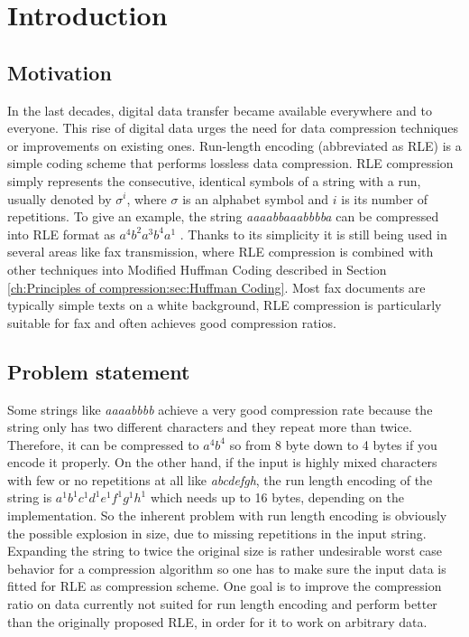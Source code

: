 
\chapter{Introduction}
\label{ch:Introduction}
\section{Motivation}
\label{ch:Introduction:sec:Motivation}
\par{
In the last decades, digital data transfer became available everywhere and to everyone. This rise of digital data urges the need for data compression techniques or improvements on existing ones. Run-length encoding \cite{rle-patent} (abbreviated as RLE) is a simple coding scheme that performs lossless data compression. RLE compression simply represents the consecutive, identical symbols of a string with a run, usually denoted by $\sigma^i$, where $\sigma$ is an alphabet symbol and $i$ is its number of repetitions. To give an example, the string \emph{aaaabbaaabbbba} can be compressed into RLE format as  $ a^{4}b^{2}a^{3}b^{4}a^{1}$ . Thanks to its simplicity it is still being used in several areas like fax transmission, where RLE compression is combined with other techniques into Modified Huffman Coding \cite{fax-rle} described in Section \ref{ch:Principles of compression:sec:Huffman Coding}. Most fax documents are typically simple texts on a white background, RLE compression is particularly suitable for fax and often achieves good compression ratios.
}
\section{Problem statement}
\label{ch:Introduction:sec:Problem statement}
\par{
Some strings like \emph{aaaabbbb} achieve a very good compression rate because the string only has two different characters and they repeat more than twice. Therefore, it can be compressed to $a^4b^4$ so from 8 byte down to 4 bytes if you encode it properly. On the other hand, if the input is highly mixed characters with few or no repetitions at all like \emph{abcdefgh}, the run length encoding of the string is $a^1b^1c^1d^1e^1f^1g^1h^1$ which needs up to 16 bytes, depending on the implementation. So the inherent problem with run length encoding is obviously the possible explosion in size, due to missing repetitions in the input string. Expanding the string to twice the original size is rather undesirable worst case behavior for a compression algorithm so one has to make sure the input data is fitted for RLE as compression scheme. One goal is to improve the compression ratio on data currently not suited for run length encoding and perform better than the originally proposed RLE, in order for it to work on arbitrary data.}


